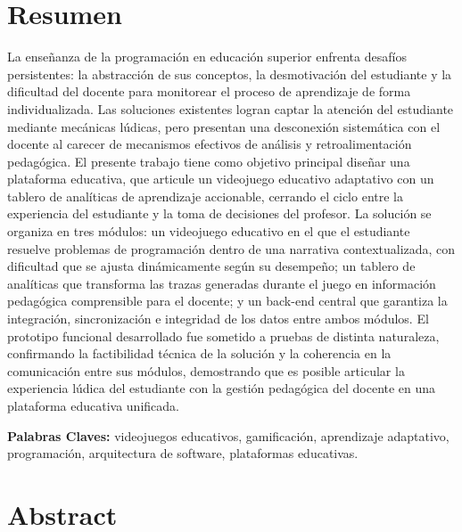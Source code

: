 \chapter*{Resumen}

La enseñanza de la programación en educación superior enfrenta desafíos persistentes:
la abstracción de sus conceptos, la desmotivación del estudiante y la dificultad del
docente para monitorear el proceso de aprendizaje de forma individualizada. Las
soluciones existentes logran captar la atención del estudiante mediante mecánicas
lúdicas, pero presentan una desconexión sistemática con el docente al carecer de
mecanismos efectivos de análisis y retroalimentación pedagógica. El presente trabajo
tiene como objetivo principal diseñar una plataforma educativa, que articule un videojuego educativo adaptativo con un tablero de analíticas de
aprendizaje accionable, cerrando el ciclo entre la experiencia del estudiante y la
toma de decisiones del profesor. La solución se organiza en tres módulos: un videojuego
educativo en el que el estudiante resuelve problemas de programación dentro de una
narrativa contextualizada, con dificultad que se ajusta dinámicamente según su
desempeño; un tablero de analíticas que transforma las trazas generadas durante el
juego en información pedagógica comprensible para el docente; y un back-end central que
garantiza la integración, sincronización e integridad de los datos entre ambos módulos.
El prototipo funcional desarrollado fue sometido a pruebas de distinta naturaleza,
confirmando la factibilidad técnica de la solución y la coherencia en la comunicación
entre sus módulos, demostrando que es posible articular la experiencia lúdica del
estudiante con la gestión pedagógica del docente en una plataforma educativa unificada.

\textbf{Palabras Claves: } videojuegos educativos, gamificación, aprendizaje adaptativo,
programación, arquitectura de software, plataformas educativas.

\newpage

\chapter*{Abstract}

